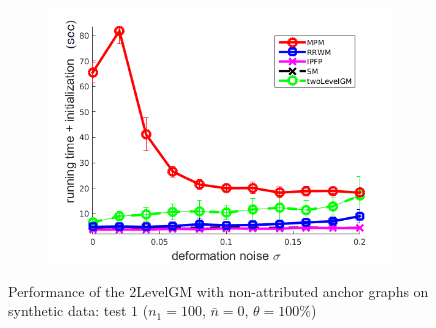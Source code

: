 \begin{figure}
\begin{subfigure}[b]{0.33\textwidth}
	\end{subfigure} 
	\begin{subfigure}[b]{0.32\textwidth}
		\centering
		\includegraphics[scale=0.33]{"chapter3/fig/SyntheticTest/no_descr/Results_v4.3.3/Test2/time_summary_avg10t"} 
	\end{subfigure} 
	\caption[Performance of the 2LevelGM with non-attributed anchor graphs on synthetic data (test $1$)]{Performance of the 2LevelGM with non-attributed anchor graphs on synthetic data: test $1$ ($n_1=100$, $\bar{n}=0$, $\theta=100\%$)}
	\label{fig:synTest1_ver433}
\end{figure}

